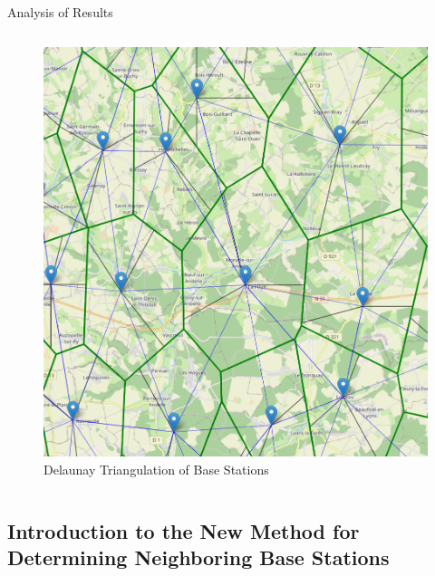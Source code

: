 \begin{frame}{Analysis of Results}
\begin{columns}
        \begin{column}{0.5\paperwidth}
            \begin{figure}
                \includegraphics[height=0.3\paperheight]{images/Altair/delon-neighb.png}
                \caption{Delaunay Triangulation of Base Stations}
            \end{figure}
        \end{column}
    \end{columns}
\end{frame}


\subsection{Introduction to the New Method for Determining Neighboring Base Stations}
\insertsubsectionframe

